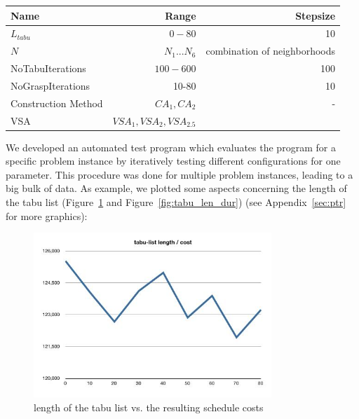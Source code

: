 \documentclass[a4paper,11pt]{article}
\begin{document}
\begin{center}
\begin{tabular}{| l | r |r | }
  \hline
  Name & Range & Stepsize \\   \hline     \hline
  $L_{tabu}$ &  $0-80$& 10\\ \hline
  $N$ &  $N_1 ... N_6$ & combination of neighborhoods\\ \hline
  NoTabuIterations & $100-600$  & 100 \\ \hline
  NoGraspIterations &  10-80 & 10  \\ \hline
  Construction Method &  $CA_1, CA_2 $& - \\ \hline
  VSA & $ VSA_1, VSA_2, VSA_{2.5}$  & \\ \hline
\end{tabular}
\end{center}

We developed an automated test program which evaluates the program for a specific problem instance
by iteratively testing different configurations for one parameter. This procedure was done for multiple problem instances, leading to a big bulk of data.
As example, we plotted some aspects concerning the length of the tabu list (Figure~\ref{fig:tabu_len_cost} and Figure~\ref{fig:tabu_len_dur})
(see Appendix~\ref{sec:ptr} for more graphics):

\begin{figure}[htb]
  \begin{center}
    \includegraphics[width=0.8\textwidth]{images/tabulist-len-cost}
  \end{center}
  \caption{length of the tabu list vs. the resulting schedule costs}
  \label{fig:tabu_len_cost}
\end{figure}
\end{document}
